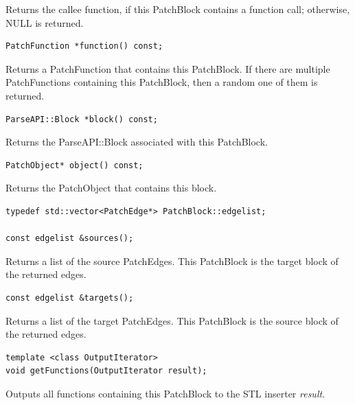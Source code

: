 \documentclass[11pt]{article}
\begin{document}
Returns the callee function, if this PatchBlock contains a function call;
otherwise, NULL is returned.


\begin{verbatim}
PatchFunction *function() const;

\end{verbatim}



Returns a PatchFunction that contains this PatchBlock. If there are multiple
PatchFunctions containing this PatchBlock, then a random one of them is
returned.


\begin{verbatim}
ParseAPI::Block *block() const;

\end{verbatim}



Returns the ParseAPI::Block associated with this PatchBlock.


\begin{verbatim}
PatchObject* object() const;

\end{verbatim}



Returns the PatchObject that contains this block.


\begin{verbatim}
typedef std::vector<PatchEdge*> PatchBlock::edgelist;

const edgelist &sources();

\end{verbatim}



Returns a list of the source PatchEdges. This PatchBlock is the target block of
the returned edges.


\begin{verbatim}
const edgelist &targets();

\end{verbatim}



Returns a list of the target PatchEdges. This PatchBlock is the source block of
the returned edges.


\begin{verbatim}
template <class OutputIterator>
void getFunctions(OutputIterator result);

\end{verbatim}



Outputs all functions containing this PatchBlock to the STL inserter \emph{result}.
\end{document}
